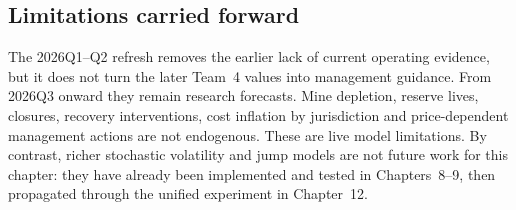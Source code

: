 \subsection{Limitations carried forward}

The 2026Q1--Q2 refresh removes the earlier lack of current operating evidence,
but it does not turn the later Team~4 values into management guidance. From
2026Q3 onward they remain research forecasts. Mine depletion, reserve lives,
closures, recovery interventions, cost inflation by jurisdiction and
price-dependent management actions are not endogenous. These are live model
limitations. By contrast, richer stochastic volatility and jump models are
not future work for this chapter: they have already been implemented and
tested in Chapters~8--9, then propagated through the unified experiment in
Chapter~12.
